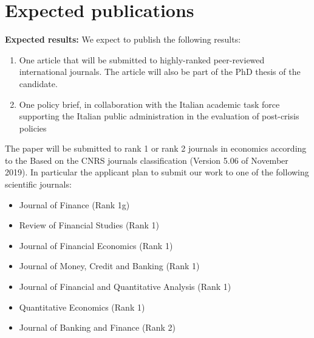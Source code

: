 \documentclass[a4paper,11pt]{article}
\begin{document}
\clearpage
\section{Expected publications}

\textbf{Expected results:} 
We expect to publish the following results:
\begin{enumerate}
	\item One article that will be submitted to highly-ranked peer-reviewed international journals. The article will also be part of the PhD thesis of the candidate.
	\item One policy brief, in collaboration with the Italian academic task force supporting the Italian public administration in the evaluation of post-crisis policies
\end{enumerate}

The paper will be submitted to rank 1 or rank 2 journals in economics according to
the Based on the CNRS journals classification (Version 5.06 of
November 2019). In particular the applicant plan to submit our work to one of the following scientific journals:
\begin{itemize}
	\item Journal of Finance (Rank 1g)
	\item Review of Financial Studies (Rank 1)
	\item Journal of Financial Economics (Rank 1)
	\item Journal of Money, Credit and Banking (Rank 1)
	\item Journal of Financial and Quantitative Analysis (Rank 1)
	\item Quantitative Economics (Rank 1) 
	\item Journal of Banking and Finance (Rank 2)
\end{itemize}


  

\clearpage


\end{document}
